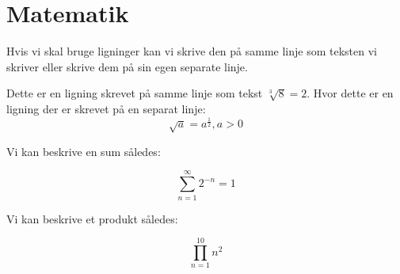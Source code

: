 \documentclass[class=report, crop=false]{standalone}
\begin{document}
    \section{Matematik}
    Hvis vi skal bruge ligninger kan vi skrive den på samme linje som teksten vi skriver eller skrive dem på sin egen separate linje.
    \begin{tcblisting}{}
        Dette er en ligning skrevet på samme linje som tekst \(\sqrt[3]{8} = 2\). Hvor dette er en ligning der er skrevet på en separat linje: \[ \sqrt{a} = a^\frac{1}{2}, a > 0 \]
    \end{tcblisting}
    \noindent Vi kan beskrive en sum således:
    \begin{tcblisting}{}
        \[ \sum_{n=1}^{\infty} 2^{-n} = 1 \]
    \end{tcblisting}
    \noindent Vi kan beskrive et produkt således:
    \begin{tcblisting}{}
        \[ \prod_{n=1}^{10} n^{2} \]
    \end{tcblisting}
\end{document}
